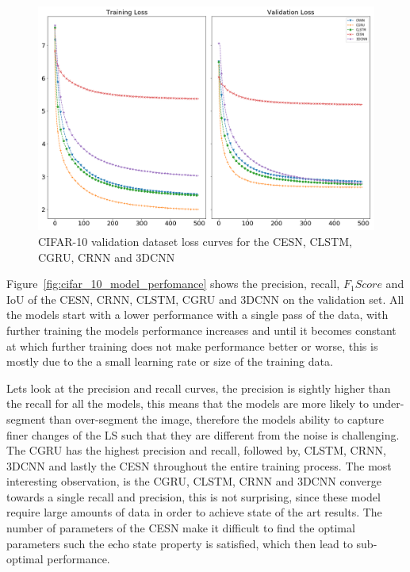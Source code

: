\documentclass{WitsPhysicsReport}
\begin{document}
\begin{figure}[H]
\centering
  \includegraphics[width=1\textwidth]{Figure/Results/CIFAR_10_loss.png}
\caption{CIFAR-10 validation dataset loss curves for the CESN, CLSTM, CGRU, CRNN and 3DCNN}
 \label{fig:cifar_10_model_loss}
\end{figure}

Figure~\ref{fig:cifar_10_model_perfomance} shows the precision, recall, $F_{1}Score$ and IoU of the CESN, CRNN, CLSTM, CGRU and 3DCNN on the validation set. All the models start with a lower performance with a single pass of the data, with further training the models performance increases and until it becomes constant at which further training does not make performance better or worse, this is mostly due to the a small learning rate or size of the training data.

Lets look at the precision and recall curves, the precision is sightly higher than the recall for all the models, this means that the models are more likely to under-segment than over-segment the image, therefore the models ability to capture finer changes of the LS such that they are different from the noise is challenging. The CGRU has the highest precision and recall, followed by, CLSTM, CRNN, 3DCNN and lastly the CESN throughout the entire training process. The most interesting observation, is the CGRU, CLSTM, CRNN and  3DCNN converge towards a single recall and precision, this is not surprising, since these model require large amounts of data in order to achieve state of the art results. The number of parameters of the CESN make it difficult to find the optimal parameters such the echo state property is satisfied, which then lead to sub-optimal performance.
\end{document}
